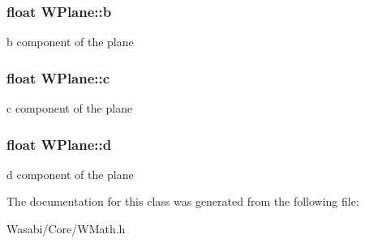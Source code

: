 \subsubsection[{\texorpdfstring{b}{b}}]{\setlength{\rightskip}{0pt plus 5cm}float W\+Plane\+::b}\hypertarget{class_w_plane_a8e27948b3519661f4fabc7053e855412}{}\label{class_w_plane_a8e27948b3519661f4fabc7053e855412}
b component of the plane 
\subsubsection[{\texorpdfstring{c}{c}}]{\setlength{\rightskip}{0pt plus 5cm}float W\+Plane\+::c}\hypertarget{class_w_plane_a7503d2b23e398ea2a38aa8f9f6a5b26d}{}\label{class_w_plane_a7503d2b23e398ea2a38aa8f9f6a5b26d}
c component of the plane 
\subsubsection[{\texorpdfstring{d}{d}}]{\setlength{\rightskip}{0pt plus 5cm}float W\+Plane\+::d}\hypertarget{class_w_plane_afe09f018ecc93649d6eaa1097f28aa5b}{}\label{class_w_plane_afe09f018ecc93649d6eaa1097f28aa5b}
d component of the plane 

The documentation for this class was generated from the following file\+:\begin{DoxyCompactItemize}
\item 
Wasabi/\+Core/W\+Math.\+h\end{DoxyCompactItemize}
